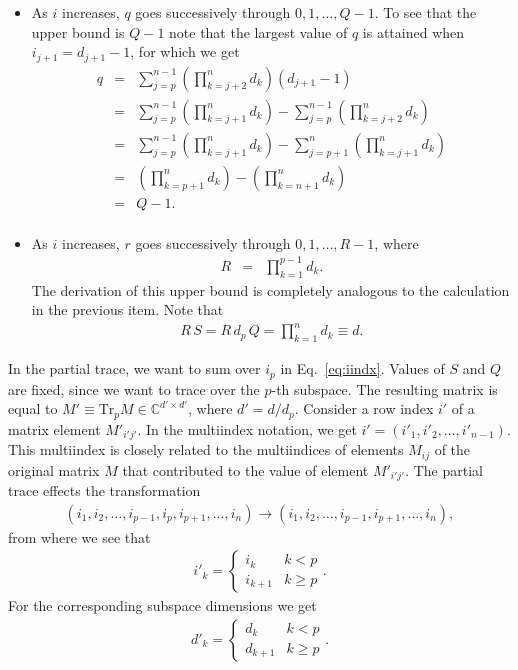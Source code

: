 \documentclass[nofootinbib,superscriptaddress,longbibliography,a4paper,amsfonts]{revtex4-2}
\begin{document}
\begin{itemize}
    \item As $i$ increases, $q$ goes successively through $0, 1, \ldots, Q-1$. To see that the upper bound is $Q-1$ note that the largest value of $q$ is attained when $i_{j+1} = d_{j+1} - 1$, for which we get
    \begin{eqnarray}
    q & = & \sum_{j=p}^{n-1} \left( \prod_{k=j+2}^n d_k \right) (d_{j+1} - 1) \\
    & = & \sum_{j=p}^{n-1} \left( \prod_{k=j+1}^n d_k \right) - \sum_{j=p}^{n-1} \left( \prod_{k=j+2}^n d_k \right) \\
    & = & \sum_{j=p}^{n-1} \left( \prod_{k=j+1}^n d_k \right) - \sum_{j=p+1}^{n} \left( \prod_{k=j+1}^n d_k \right) \\
    & = & \left( \prod_{k=p+1}^n d_k \right) - \left( \prod_{k=n+1}^n d_k \right) \\
    & = & Q - 1. \\
    \end{eqnarray}
    
    \item As $i$ increases, $r$ goes successively through $0, 1, \ldots, R-1$, where
    \begin{eqnarray}
    R & = & \prod_{k=1}^{p-1} d_k.
    \end{eqnarray}
    The derivation of this upper bound is completely analogous to the calculation in the previous item. Note that
    \begin{eqnarray}
    R \, S = R \, d_p \, Q = \prod_{k=1}^{n} d_k \equiv d.
    \label{eq:rs}
    \end{eqnarray}
\end{itemize}

In the partial trace, we want to sum over $i_p$ in Eq.~\eqref{eq:iindx}. Values of $S$ and $Q$ are fixed, since we want to trace over the $p$-th subspace. The resulting matrix is equal to $M' \equiv \mathrm{Tr}_p M \in \mathbb{C}^{d' \times d'}$, where $d' = d/d_p$. Consider a row index $i'$ of a matrix element $M'_{i'j'}$. In the multiindex notation, we get $i' = (i'_1, i'_2, \ldots, i'_{n-1})$. This multiindex is closely related to the multiindices of elements $M_{ij}$ of the original matrix $M$ that contributed to the value of element $M'_{i'j'}$. The partial trace effects the transformation
\begin{eqnarray}
(i_1, i_2, \ldots, i_{p-1}, i_p, i_{p+1}, \ldots, i_n) \to (i_1, i_2, \ldots, i_{p-1}, i_{p+1}, \ldots, i_n),
\end{eqnarray}
from where we see that
\begin{eqnarray}
i'_k = 
\begin{cases}
i_k & k < p \\ i_{k+1} & k \geq p
\end{cases}.
\end{eqnarray}
For the corresponding subspace dimensions we get
\begin{eqnarray}
d'_k = 
\begin{cases}
d_k & k < p \\ d_{k+1} & k \geq p
\end{cases}.
\end{eqnarray}
\end{document}
